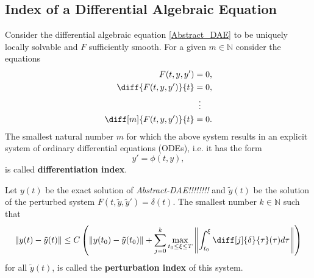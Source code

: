 	\subsection{Index of a Differential Algebraic Equation}
	\begin{frame}
		\begin{definition}%
			Consider the differential algebraic equation \eqref{Abstract_DAE} to be uniquely locally solvable and $F$ sufficiently smooth. For a given $m \in \mathbb{N}$ consider the equations
			\begin{displaymath}
				\begin{aligned}
					F(t,y,y') &= 0, \\
					\diff{F(t,y,y')}{t} &= 0, \\
					&\vdotswithin{=} \\
					\diff[m]{F(t,y,y')}{t} &= 0.
				\end{aligned}
			\end{displaymath}
			The smallest natural number $m$ for which the above system results in an explicit system of ordinary differential equations (ODEs), i.e. it has the form
			\begin{displaymath}
				y' = \phi(t,y),
			\end{displaymath}
			is called \textbf{differentiation index}.
		\end{definition}
	\end{frame}

	\begin{frame}
		\begin{definition}%
			Let $y(t)$ be the exact solution of \emph{Abstract-DAE!!!!!!!!} and $\tilde{y}(t)$ be the solution of the perturbed system $F(t, \tilde{y}, \tilde{y}') = \delta(t)$. The smallest number $k \in \mathbb{N}$ such that 
			\begin{displaymath}
				\|y(t)-\tilde{y}(t)\| \leq C \left(\|y(t_0)-\tilde{y}(t_0)\|+\sum_{j=0}^{k}\max_{t_0 \leq \xi \leq T} \left\rVert 		\int_{t_0}^{\xi}\diff[j]{\delta}{\tau}(\tau)d \tau \right\rVert \right)
			\end{displaymath}
			for all $\tilde{y}(t)$, is called the \textbf{perturbation index} of this system.
		\end{definition}
	\end{frame}


